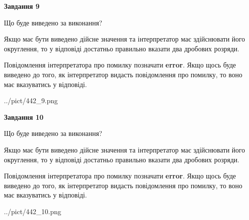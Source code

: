 \documentclass[12pt, ukrainian]{article}
\begin{document}
{\begin {Large}
{\begin {center}\textbf{Завдання 9}\end {center}}\par
Що буде виведено за виконання? \par

Якщо має бути виведено дійсне значення та інтерпретатор має здійснювати його округлення, 
то у відповіді достатньо правильно вказати два дробових розряди.

Повідомлення інтерпретатора про помилку позначати \textbf{error}.
Якщо щось буде виведено до того, як інтерпретатор видасть повідомлення про помилку, 
то воно має вказуватись у відповіді. \par

\begin{center}
	{../pict/442_9.png}
\end{center}
\newpage

{\begin {center}\textbf{Завдання 10}\end {center}}\par
Що буде виведено за виконання? \par

Якщо має бути виведено дійсне значення та інтерпретатор має здійснювати його округлення, 
то у відповіді достатньо правильно вказати два дробових розряди.

Повідомлення інтерпретатора про помилку позначати \textbf{error}.
Якщо щось буде виведено до того, як інтерпретатор видасть повідомлення про помилку, 
то воно має вказуватись у відповіді. \par

\begin{center}
	{../pict/442_10.png}
\end{center}
\newpage

\end {Large}}
\end{document}
